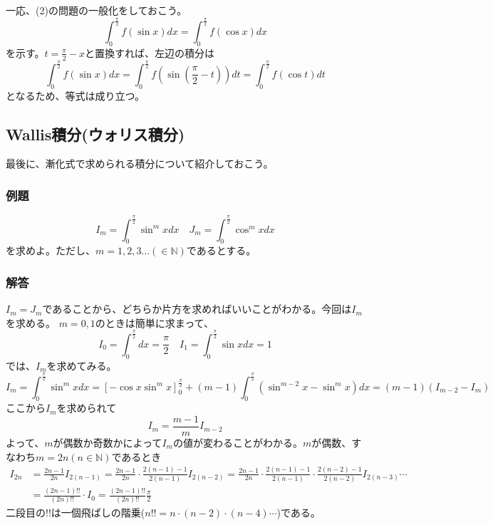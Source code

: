 \documentclass[a4j,dvipdfmx]{jsarticle}
\begin{document}
\subsubsection*{}
一応、(2)の問題の一般化をしておこう。
\begin{equation*}
    \int_0^{\frac{\pi}{2}}f(\sin x)dx=\int_0^{\frac{\pi}{2}}f(\cos x)dx
\end{equation*}
を示す。$t=\frac{\pi}{2}-x$と置換すれば、左辺の積分は
\begin{equation*}
    \int_0^{\frac{\pi}{2}}f(\sin x)dx=\int_0^{\frac{\pi}{2}}f(\sin(\frac{\pi}{2}-t))dt=\int_0^{\frac{\pi}{2}}f(\cos t)dt
\end{equation*}
となるため、等式は成り立つ。
\newpage
\subsection{Wallis積分(ウォリス積分)}
最後に、漸化式で求められる積分について紹介しておこう。
\subsubsection*{例題}
\begin{equation*}
    I_m=\int_0^\frac{\pi}{2} \sin^m xdx\quad J_m=\int_0^\frac{\pi}{2}\cos^m xdx
\end{equation*}
を求めよ。ただし、$m=1,2,3...(\in\mathbb{N})$であるとする。
\subsubsection*{解答}
$I_m=J_m$であることから、どちらか片方を求めればいいことがわかる。今回は$I_m$を求める。
$m=0,1$のときは簡単に求まって、
\begin{equation*}
    I_0=\int_0^\frac{\pi}{2}dx=\frac{\pi}{2}\quad I_1 =\int_0^\frac{\pi}{2}\sin xdx=1
\end{equation*}
では、$I_{m}$を求めてみる。
\begin{equation*}
    I_{m}=\int_0^\frac{\pi}{2}\sin^{m}xdx=\left[-\cos x\sin^{m} x\right]_0^\frac{\pi}{2}+(m-1)\int_0^\frac{\pi}{2}(\sin^{m-2}x-\sin^m x)dx=(m-1)(I_{m-2}-I_m)
\end{equation*}
ここから$I_m$を求められて
\begin{equation*}
    I_m=\frac{m-1}{m}I_{m-2}
\end{equation*}
よって、$m$が偶数か奇数かによって$I_m$の値が変わることがわかる。$m$が偶数、すなわち$m=2n(n\in\mathbb{N})$であるとき
\begin{align*}
    I_{2n}&=\frac{2n-1}{2n}I_{2(n-1)}=\frac{2n-1}{2n}\cdot\frac{2(n-1)-1}{2(n-1)}I_{2(n-2)}=\frac{2n-1}{2n}\cdot\frac{2(n-1)-1}{2(n-1)}\cdot\frac{2(n-2)-1}{2(n-2)}I_{2(n-3)}\cdots\\
    &=\frac{(2n-1)!!}{(2n)!!}\cdot I_0=\frac{(2n-1)!!}{(2n)!!}\frac{\pi}{2}
\end{align*}
二段目の$!!$は一個飛ばしの階乗($n!!=n\cdot(n-2)\cdot(n-4)\cdots$)である。
\end{document}
